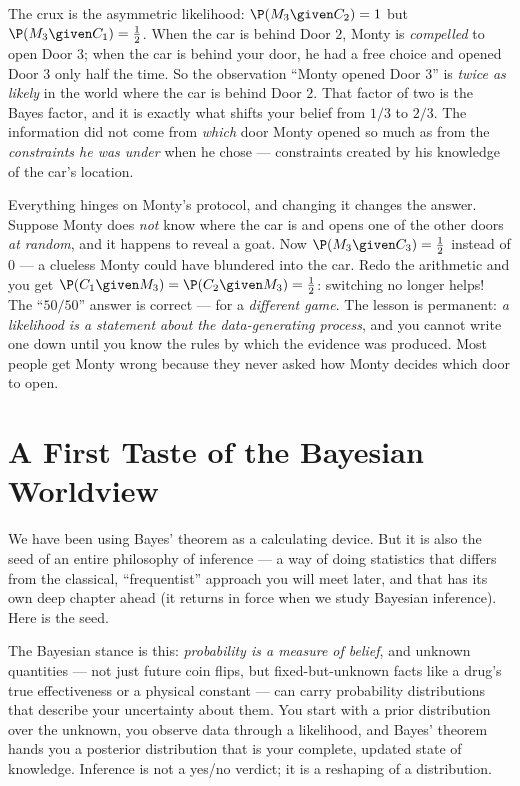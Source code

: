 \begin{happeningbox}
The crux is the asymmetric likelihood: $\P(M_3\given C_2)=1$ but $\P(M_3\given C_1)=\tfrac12$.
When the car is behind Door $2$, Monty is \emph{compelled} to open Door $3$; when the car
is behind your door, he had a free choice and opened Door $3$ only half the time. So the
observation ``Monty opened Door $3$'' is \emph{twice as likely} in the world where the car
is behind Door $2$. That factor of two is the Bayes factor, and it is exactly what shifts
your belief from $1/3$ to $2/3$. The information did not come from \emph{which} door Monty
opened so much as from the \emph{constraints he was under} when he chose --- constraints
created by his knowledge of the car's location.
\end{happeningbox}

\begin{trapbox}
Everything hinges on Monty's protocol, and changing it changes the answer. Suppose Monty
does \emph{not} know where the car is and opens one of the other doors \emph{at random},
and it happens to reveal a goat. Now $\P(M_3\given C_3)=\tfrac12$ instead of $0$ --- a
clueless Monty could have blundered into the car. Redo the arithmetic and you get
$\P(C_1\given M_3) = \P(C_2 \given M_3) = \tfrac12$: switching no longer helps! The
``$50/50$'' answer is correct --- for a \emph{different game}. The lesson is permanent:
\emph{a likelihood is a statement about the data-generating process}, and you cannot write
one down until you know the rules by which the evidence was produced. Most people get
Monty wrong because they never asked how Monty decides which door to open.
\end{trapbox}

\section{A First Taste of the Bayesian Worldview}
\label{ch05:worldview}

We have been using Bayes' theorem as a calculating device. But it is also the seed of an
entire philosophy of inference --- a way of doing statistics that differs from the
classical, ``frequentist'' approach you will meet later, and that has its own deep chapter
ahead (it returns in force when we study Bayesian inference). Here is the seed.

The Bayesian stance is this: \emph{probability is a measure of belief}, and unknown
quantities --- not just future coin flips, but fixed-but-unknown facts like a drug's true
effectiveness or a physical constant --- can carry probability distributions that describe
your uncertainty about them. You start with a prior distribution over the unknown, you
observe data through a likelihood, and Bayes' theorem hands you a posterior distribution
that is your complete, updated state of knowledge. Inference is not a yes/no verdict; it
is a reshaping of a distribution.

